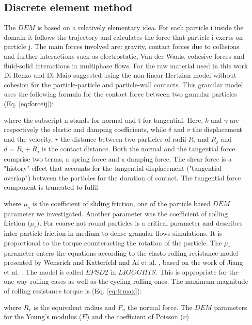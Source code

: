 \subsection{Discrete element method}
\label{subsec:dem}
The $DEM$ is based on a relatively elementary idea. 
For each particle i inside the domain it follows the trajectory and calculates the force that particle i exerts on particle j. 
The main forces involved are: gravity, contact forces due to collisions and further interactions such as electrostatic, 
Van der Waals, cohesive forces and fluid-solid interactions in multiphase flows. For the raw material used in this work 
Di Renzo and Di Maio \cite{RefWorks:145} suggested using the non-linear Hertzian model without cohesion for 
the particle-particle and particle-wall contacts. 
This granular model uses the following formula for the contact force between two granular particles (Eq. \ref{eq:forceij}):

where the subscript n stands for normal and t for tangential. 
Here, $k$ and $\gamma$ are respectively the elastic and damping coefficients, 
while $\delta$ and $v$ the displacement and the velocity, $r$ the distance
between two particles of radii $R_i$ and $R_j$ and $d = R_i + R_j $ is the
contact distance.
Both the normal and the tangential
force comprise two terms, a spring force and a damping force. 
The shear force is a "history" effect that accounts for the tangential displacement 
("tangential overlap") between the particles for the duration of contact. 
The tangential force component is truncated to fulfil 

where $\mu_s$ is the coefficient of sliding friction, one of the particle based
$DEM$ parameter we investigated. 
Another parameter was the coefficient of rolling friction ($\mu_r$). 
For coarse not round particles is a critical parameter and describes inter-particle 
friction in medium to dense granular flows simulations. It is proportional to the 
torque counteracting the rotation of the particle. The $\mu_r$ parameter enters the 
equations according to the elasto-rolling resistance model presented by Wensrich and 
Katterfeld \cite{RefWorks:87} and Ai et al. \cite{RefWorks:131}, 
based on the work of Jiang et al. \cite{RefWorks:143}. 
The model is called $EPSD2$ in $LIGGGHTS$. This is appropriate for the one way
rolling cases as well as the cycling rolling ones.
The maximum magnitude of rolling resistance torque is (Eq. \ref{eq:trmax}):

where $R_r$ is the equivalent radius and $F_n$ the normal force.
The $DEM$ parameters for the Young's modulus ($E$) and the coefficient of Poisson ($\nu$) 
